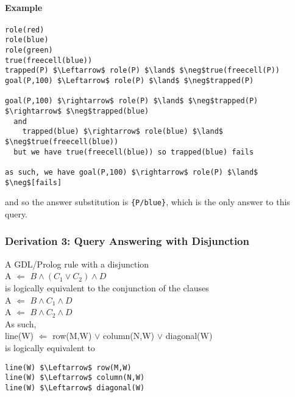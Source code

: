 \paragraph{Example}
\begin{lstlisting}
role(red)
role(blue)
role(green)
true(freecell(blue))
trapped(P) $\Leftarrow$ role(P) $\land$ $\neg$true(freecell(P))
goal(P,100) $\Leftarrow$ role(P) $\land$ $\neg$trapped(P)

goal(P,100) $\rightarrow$ role(P) $\land$ $\neg$trapped(P) $\rightarrow$ $\neg$trapped(blue)
  and
    trapped(blue) $\rightarrow$ role(blue) $\land$ $\neg$true(freecell(blue))
  but we have true(freecell(blue)) so trapped(blue) fails

as such, we have goal(P,100) $\rightarrow$ role(P) $\land$ $\neg$[fails]
\end{lstlisting}

and so the answer substitution is \verb|{P/blue}|, which is the only answer to
this query.

\subsubsection{Derivation 3: Query Answering with Disjunction}
A GDL/Prolog rule with a disjunction\\
\indent A $\Leftarrow$ $B \land (C_1 \lor C_2) \land D$\\
is logically equivalent to the conjunction of the clauses\\
\indent A $\Leftarrow$ $B \land C_1 \land D$\\
\indent A $\Leftarrow$ $B \land C_2 \land D$\\

As such,\\
\indent line(W) $\Leftarrow$ row(M,W) $\lor$ column(N,W) $\lor$ diagonal(W)\\
is logically equivalent to
\begin{lstlisting}
line(W) $\Leftarrow$ row(M,W)
line(W) $\Leftarrow$ column(N,W)
line(W) $\Leftarrow$ diagonal(W)
\end{lstlisting}

